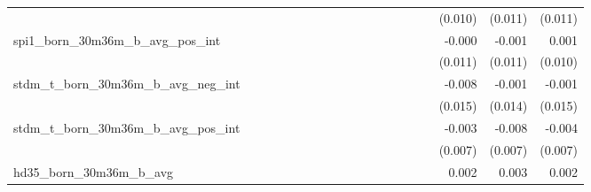 \begin{tabular}{lrrrrrrrrrrrrrrrrrr}
                                            &              &              &              &              &              &              &              &              &               &              &              &               &              &              &               &      (0.010) &      (0.011) &       (0.011) \\ 
spi1\_born\_30m36m\_b\_avg\_pos\_int        &              &              &              &              &              &              &              &              &               &              &              &               &              &              &               &       -0.000 &       -0.001 &         0.001 \\ 
                                            &              &              &              &              &              &              &              &              &               &              &              &               &              &              &               &      (0.011) &      (0.011) &       (0.010) \\ 
stdm\_t\_born\_30m36m\_b\_avg\_neg\_int     &              &              &              &              &              &              &              &              &               &              &              &               &              &              &               &       -0.008 &       -0.001 &        -0.001 \\ 
                                            &              &              &              &              &              &              &              &              &               &              &              &               &              &              &               &      (0.015) &      (0.014) &       (0.015) \\ 
stdm\_t\_born\_30m36m\_b\_avg\_pos\_int     &              &              &              &              &              &              &              &              &               &              &              &               &              &              &               &       -0.003 &       -0.008 &        -0.004 \\ 
                                            &              &              &              &              &              &              &              &              &               &              &              &               &              &              &               &      (0.007) &      (0.007) &       (0.007) \\ 
hd35\_born\_30m36m\_b\_avg                  &              &              &              &              &              &              &              &              &               &              &              &               &              &              &               &        0.002 &        0.003 &         0.002 \\ 

\end{tabular}
